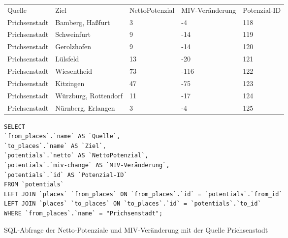 \begin{tabular}{ l  l  l  l  l }
Quelle & Ziel & NettoPotenzial & MIV-Veränderung & Potenzial-ID\\ 
Prichsenstadt & Bamberg, Haßfurt & 3 & -4 & 118\\ 
Prichsenstadt & Schweinfurt & 9 & -14 & 119\\ 
Prichsenstadt & Gerolzhofen & 9 & -14 & 120\\ 
Prichsenstadt & Lülsfeld & 13 & -20 & 121\\ 
Prichsenstadt & Wiesentheid & 73 & -116 & 122\\ 
Prichsenstadt & Kitzingen & 47 & -75 & 123\\ 
Prichsenstadt & Würzburg, Rottendorf & 11 & -17 & 124\\ 
Prichsenstadt & Nürnberg, Erlangen & 3 & -4 & 125\\ 
\end{tabular}    
\newline
\newline
\begin{listing}[htbp]
\begin{verbatim}
SELECT
`from_places`.`name` AS `Quelle`, 
`to_places`.`name` AS `Ziel`, 
`potentials`.`netto` AS `NettoPotenzial`, 
`potentials`.`miv-change` AS `MIV-Veränderung`, 
`potentials`.`id` AS `Potenzial-ID`
FROM `potentials`
LEFT JOIN `places` `from_places` ON `from_places`.`id` = `potentials`.`from_id`
LEFT JOIN `places` `to_places` ON `to_places`.`id` = `potentials`.`to_id`
WHERE `from_places`.`name` = "Prichsenstadt";
\end{verbatim}
\caption{SQL-Abfrage der Netto-Potenziale und MIV-Veränderung mit der Quelle Prichsenstadt}\label{lst-fz-prichsenstadt}
\end{listing}